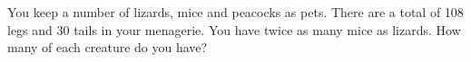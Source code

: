 You keep a number of lizards, mice and peacocks as pets.  There are a total of 108 legs and 30 tails in your menagerie.  You have twice as many mice as lizards.  How many of each creature do you have?